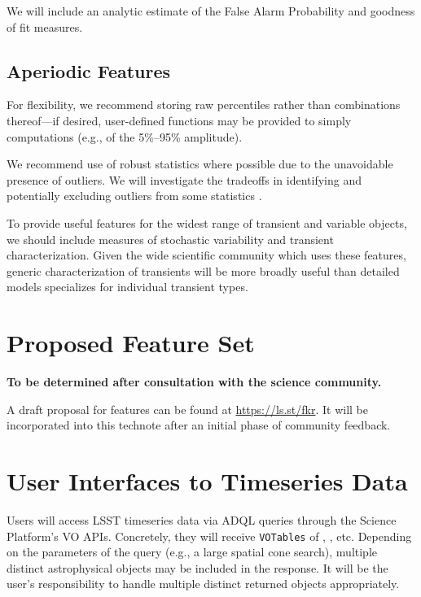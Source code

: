 \documentclass[DM,authoryear,toc]{lsstdoc}
\begin{document}
We will include an analytic estimate of the False Alarm Probability \citep[e.g.,][]{Baluev:08:FAP, Delisle:20:LSFAPCorrelatedNoise} and goodness of fit measures.

\subsection{Aperiodic Features}

For flexibility, we recommend storing raw percentiles rather than combinations thereof---if desired, user-defined functions may be provided to simply computations (e.g., of the 5\%--95\% amplitude).

We recommend use of robust statistics where possible due to the unavoidable presence of outliers.
We will investigate the tradeoffs in identifying and potentially excluding outliers from some statistics \citep[e.g.,][]{Pashchenko:18:OGLEClassification}.

To provide useful features for the widest range of transient and variable objects, we should include measures of stochastic variability and transient characterization.
Given the wide scientific community which uses these features, generic characterization of transients will be more broadly useful than detailed models specializes for individual transient types.

\section{Proposed Feature Set} \label{sec:proposed_features}

\textbf{To be determined after consultation with the science community.}

A draft proposal for features can be found at \url{https://ls.st/fkr}.
It will be incorporated into this technote after an initial phase of community feedback.

\section{User Interfaces to Timeseries Data} \label{sec:API}

Users will access LSST timeseries data via ADQL queries through the Science Platform's VO APIs.
Concretely, they will receive \texttt{VOTables} of \DIAObjects, \DIASources, etc.
Depending on the parameters of the query (e.g., a large spatial cone search), multiple distinct astrophysical objects may be included in the response.
It will be the user's responsibility to handle multiple distinct returned objects appropriately.
\end{document}
